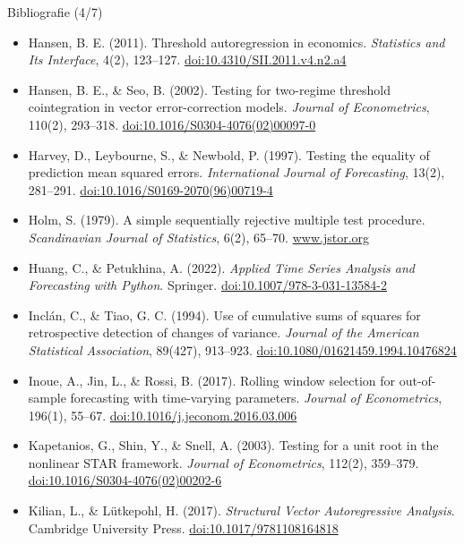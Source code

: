 \begin{frame}{Bibliografie (4/7)}
\itemsize{\tiny}
\begin{itemize}
    \item Hansen, B. E. (2011). Threshold autoregression in economics. \textit{Statistics and Its Interface}, 4(2), 123--127. \href{https://doi.org/10.4310/SII.2011.v4.n2.a4}{doi:10.4310/SII.2011.v4.n2.a4}
    \item Hansen, B. E., \& Seo, B. (2002). Testing for two-regime threshold cointegration in vector error-correction models. \textit{Journal of Econometrics}, 110(2), 293--318. \href{https://doi.org/10.1016/S0304-4076(02)00097-0}{doi:10.1016/S0304-4076(02)00097-0}
    \item Harvey, D., Leybourne, S., \& Newbold, P. (1997). Testing the equality of prediction mean squared errors. \textit{International Journal of Forecasting}, 13(2), 281--291. \href{https://doi.org/10.1016/S0169-2070(96)00719-4}{doi:10.1016/S0169-2070(96)00719-4}
    \item Holm, S. (1979). A simple sequentially rejective multiple test procedure. \textit{Scandinavian Journal of Statistics}, 6(2), 65--70. \href{https://www.jstor.org/stable/4615733}{www.jstor.org}
    \item Huang, C., \& Petukhina, A. (2022). \textit{Applied Time Series Analysis and Forecasting with Python}. Springer. \href{https://doi.org/10.1007/978-3-031-13584-2}{doi:10.1007/978-3-031-13584-2}
    \item Inclán, C., \& Tiao, G. C. (1994). Use of cumulative sums of squares for retrospective detection of changes of variance. \textit{Journal of the American Statistical Association}, 89(427), 913--923. \href{https://doi.org/10.1080/01621459.1994.10476824}{doi:10.1080/01621459.1994.10476824}
    \item Inoue, A., Jin, L., \& Rossi, B. (2017). Rolling window selection for out-of-sample forecasting with time-varying parameters. \textit{Journal of Econometrics}, 196(1), 55--67. \href{https://doi.org/10.1016/j.jeconom.2016.03.006}{doi:10.1016/j.jeconom.2016.03.006}
    \item Kapetanios, G., Shin, Y., \& Snell, A. (2003). Testing for a unit root in the nonlinear STAR framework. \textit{Journal of Econometrics}, 112(2), 359--379. \href{https://doi.org/10.1016/S0304-4076(02)00202-6}{doi:10.1016/S0304-4076(02)00202-6}
    \item Kilian, L., \& Lütkepohl, H. (2017). \textit{Structural Vector Autoregressive Analysis}. Cambridge University Press. \href{https://doi.org/10.1017/9781108164818}{doi:10.1017/9781108164818}

\end{itemize}
\end{frame}
